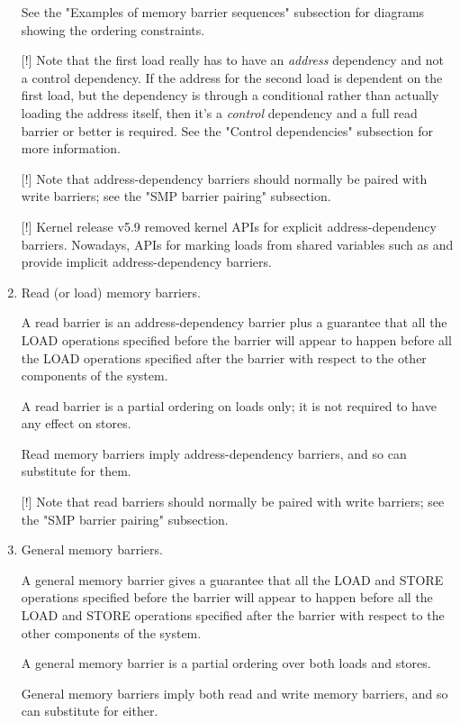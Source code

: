 \begin{enumerate}
     See the "Examples of memory barrier sequences" subsection for diagrams
     showing the ordering constraints.

     [!] Note that the first load really has to have an \emph{address}
     dependency and not a control dependency.
     If the address for the second load is dependent on the first load,
     but the dependency is through a conditional rather than actually
     loading the address itself, then it's a \emph{control} dependency and
     a full read barrier or better is required.
     See the "Control dependencies" subsection for more information.

     [!] Note that address-dependency barriers should normally be paired with
     write barriers; see the "SMP barrier pairing" subsection.

     [!] Kernel release v5.9 removed kernel APIs for explicit
     address-dependency barriers.
     Nowadays, APIs for marking loads from shared variables such as
      and  provide implicit
     address-dependency barriers.

 \item
     Read (or load) memory barriers.

     A read barrier is an address-dependency barrier plus a guarantee that all
     the LOAD operations specified before the barrier will appear to happen
     before all the LOAD operations specified after the barrier with respect to
     the other components of the system.

     A read barrier is a partial ordering on loads only; it is not required to
     have any effect on stores.

     Read memory barriers imply address-dependency barriers, and so can
     substitute for them.

     [!] Note that read barriers should normally be paired with write barriers;
     see the "SMP barrier pairing" subsection.


 \item
     General memory barriers.

     A general memory barrier gives a guarantee that all the LOAD and STORE
     operations specified before the barrier will appear to happen before all
     the LOAD and STORE operations specified after the barrier with respect to
     the other components of the system.

     A general memory barrier is a partial ordering over both loads and stores.

     General memory barriers imply both read and write memory barriers, and so
     can substitute for either.
\end{enumerate}

